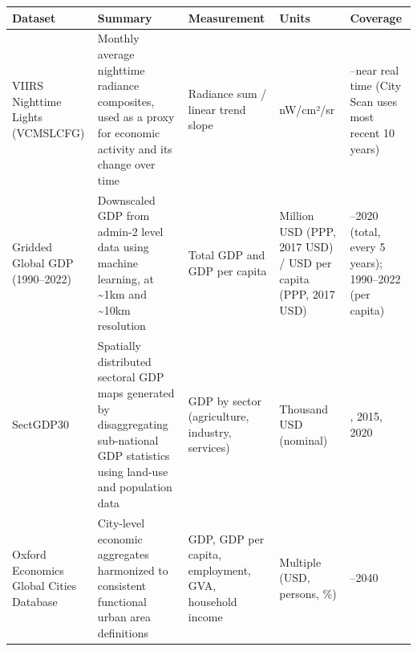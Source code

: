 \documentclass[
  letterpaper,
  DIV=11,
  numbers=noendperiod]{scrreprt}
\newcounter{none} %
\begin{document}
{\def\LTcaptype{none} %
\begin{longtable}[]{@{}
  >{\raggedright\arraybackslash}p{}
  >{\raggedright\arraybackslash}p{}
  >{\raggedright\arraybackslash}p{}
  >{\raggedright\arraybackslash}p{}
  >{\raggedright\arraybackslash}p{}@{}}
\toprule\noalign{}
\begin{minipage}[b]{\linewidth}\raggedright
Dataset
\end{minipage} & \begin{minipage}[b]{\linewidth}\raggedright
Summary
\end{minipage} & \begin{minipage}[b]{\linewidth}\raggedright
Measurement
\end{minipage} & \begin{minipage}[b]{\linewidth}\raggedright
Units
\end{minipage} & \begin{minipage}[b]{\linewidth}\raggedright
Coverage
\end{minipage} \\
\midrule\noalign{}
\endhead
\bottomrule\noalign{}
\endlastfoot
VIIRS Nighttime Lights (VCMSLCFG) & Monthly average nighttime radiance
composites, used as a proxy for economic activity and its change over
time & Radiance sum / linear trend slope & nW/cm²/sr & 2013--near real
time (City Scan uses most recent 10 years) \\
Gridded Global GDP (1990--2022) & Downscaled GDP from admin-2 level data
using machine learning, at \textasciitilde1km and \textasciitilde10km
resolution & Total GDP and GDP per capita & Million USD (PPP, 2017 USD)
/ USD per capita (PPP, 2017 USD) & 1990--2020 (total, every 5 years);
1990--2022 (per capita) \\
SectGDP30 & Spatially distributed sectoral GDP maps generated by
disaggregating sub-national GDP statistics using land-use and population
data & GDP by sector (agriculture, industry, services) & Thousand USD
(nominal) & 2010, 2015, 2020 \\
Oxford Economics Global Cities Database & City-level economic aggregates
harmonized to consistent functional urban area definitions & GDP, GDP
per capita, employment, GVA, household income & Multiple (USD, persons,
\%) & 2000--2040 \\
\end{longtable}
}
\end{document}
